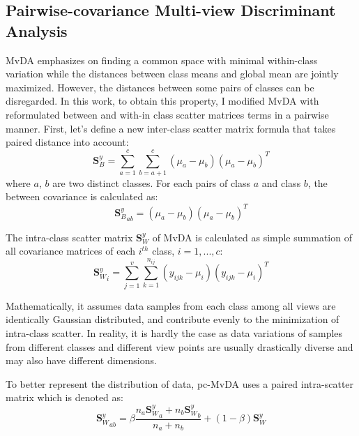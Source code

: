 
\subsection{Pairwise-covariance Multi-view Discriminant Analysis}
    MvDA emphasizes on finding a common space with minimal within-class variation while the distances between class means and global mean are jointly maximized.
    However, the distances between some pairs of classes can be disregarded.
    In this work, to obtain this property, I modified MvDA with reformulated between and with-in class scatter matrices terms in a pairwise manner.
    First, let's define a new inter-class scatter matrix formula that takes paired distance into account:
    \begin{equation}
        \boldsymbol{S}_B^y=\sum_{a=1}^{c}\sum_{b=a+1}^{c}{\left(\mu_a-\mu_b\right)\left(\mu_a-\mu_b\right)^T}
    \end{equation}
    where $a$, $b$ are two distinct classes. For each pairs of class $a$ and class $b$, the between covariance is calculated as:
    \begin{equation}
        {\boldsymbol{S}_B^y}_{ab}={\left(\mu_a-\mu_b\right)\left(\mu_a-\mu_b\right)^T}
        \label{eq:Sb_ab}
    \end{equation}

    The intra-class scatter matrix $\boldsymbol{S}_W^y$ of MvDA is calculated as simple summation of all covariance matrices of each $i^{th}$ class, $i = {1,...,c}$:
    \begin{equation}
        {\boldsymbol{S}_W^y}_i=\sum_{j=1}^{v}\sum_{k=1}^{n_{ij}}{\left(y_{ijk}-\mu_i\right)\left(y_{ijk}-\mu_i\right)^T}
    \end{equation}

    Mathematically, it assumes data samples from each class among all views are identically Gaussian distributed, and contribute evenly to the minimization of intra-class scatter.
    In reality, it is hardly the case as data variations of samples from different classes and different view points are usually drastically diverse and may also have different dimensions.

    To better represent the distribution of data, pc-MvDA uses a paired intra-scatter matrix which is denoted as:
    \begin{equation}
        {\boldsymbol{S}_W^y}_{ab}=\beta\frac{n_a{\boldsymbol{S}_W^y}_a+n_b{\boldsymbol{S}_W^y}_b}{n_a+n_b}+\left(1-\beta\right){\boldsymbol{S}_W^y}
        \label{eq:Sw_ab}
    \end{equation}

